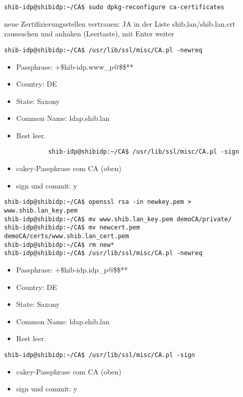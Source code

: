 \begin{lstlisting}
shib-idp@shibidp:~/CA$ sudo dpkg-reconfigure ca-certificates 
\end{lstlisting}
neue Zertifizierungsstellen vertrauen: JA \newline
in der Liste shib,lan/shib.lan.crt raussuchen und anhaken (Leertaste), mit Enter weiter
		
\begin{lstlisting}
shib-idp@shibidp:~/CA$ /usr/lib/ssl/misc/CA.pl -newreq
\end{lstlisting}
\begin{itemize}
\item Passphrase: +\$hib-idp.www\_p@\$\$**
\item Country: DE
\item State: Saxony
\item Common Name: ldap.shib.lan
\item Rest leer.
\end{itemize}
\begin{lstlisting}
			shib-idp@shibidp:~/CA$ /usr/lib/ssl/misc/CA.pl -sign
\end{lstlisting}
\begin{itemize}
  \item cakey-Passphrase com CA (oben)
  \item sign und commit: y
\end{itemize}
\begin{lstlisting}
shib-idp@shibidp:~/CA$ openssl rsa -in newkey.pem > www.shib.lan_key.pem
shib-idp@shibidp:~/CA$ mv www.shib.lan_key.pem demoCA/private/
shib-idp@shibidp:~/CA$ mv newcert.pem demoCA/certs/www.shib.lan_cert.pem
shib-idp@shibidp:~/CA$ rm new*
shib-idp@shibidp:~/CA$ /usr/lib/ssl/misc/CA.pl -newreq
\end{lstlisting}
\begin{itemize}
\item Passphrase: +\$hib-idp.idp\_p@\$\$**
\item Country: DE
\item State: Saxony
\item Common Name: ldap.shib.lan
\item Rest leer.
\end{itemize}
\begin{lstlisting}
shib-idp@shibidp:~/CA$ /usr/lib/ssl/misc/CA.pl -sign
\end{lstlisting}
\begin{itemize}
\item cakey-Passphrase com CA (oben)
\item sign und commit: y
\end{itemize}			
